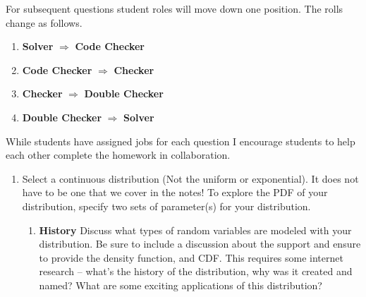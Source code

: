 \documentclass{article}\usepackage[]{graphicx}\usepackage[]{color}
\begin{document}
\noindent For subsequent questions student roles will move down one position. The rolls change as follows.
\begin{enumerate}
  \item \textbf{Solver} $\Longrightarrow$ \textbf{Code Checker}
  \item \textbf{Code Checker} $\Longrightarrow$ \textbf{Checker}
  \item \textbf{Checker} $\Longrightarrow$ \textbf{Double Checker}
  \item \textbf{Double Checker} $\Longrightarrow$ \textbf{Solver}
\end{enumerate}
While students have assigned jobs for each question I encourage students to help 
each other complete the homework in collaboration.
\newpage
\begin{enumerate}
  \item\label{Q1} Select a continuous distribution (Not the uniform or exponential). 
  It does not have to be one that we cover in the notes! To explore the PDF of your 
  distribution, specify two sets of parameter(s) for your distribution.
  \begin{enumerate}
  \item \textbf{History} Discuss what types of random variables are modeled with 
  your distribution. Be sure to include a discussion about the support and ensure 
  to provide the density function, and CDF. This requires some internet research 
  -- what's the history of the distribution, why was it created and named? What 
  are some exciting applications of this distribution?
  

\end{enumerate}
\end{enumerate}
\end{document}
